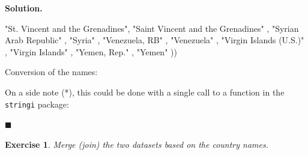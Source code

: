 \documentclass[10pt,b5paper,krantz1]{krantz}
\newenvironment{Shaded}{\begin{snugshade}}{\end{snugshade}}
\newcommand{\ControlFlowTok}[1]{\textcolor[rgb]{0.27,0.27,0.27}{\textbf{#1}}}
\newcommand{\DataTypeTok}[1]{\textcolor[rgb]{0.27,0.27,0.27}{#1}}
\newcommand{\DecValTok}[1]{\textcolor[rgb]{0.06,0.06,0.06}{#1}}
\newcommand{\KeywordTok}[1]{\textcolor[rgb]{0.27,0.27,0.27}{\textbf{#1}}}
\newcommand{\NormalTok}[1]{#1}
\newcommand{\OperatorTok}[1]{\textcolor[rgb]{0.43,0.43,0.43}{\textbf{#1}}}
\newcommand{\OtherTok}[1]{\textcolor[rgb]{0.37,0.37,0.37}{#1}}
\newcommand{\StringTok}[1]{\textcolor[rgb]{0.5,0.5,0.5}{#1}}
\newtheorem{exercise}{Exercise}[chapter]
\newenvironment{solution}{%
\bigskip\noindent\textbf{Solution. }%
\it\ignorespaces%
\ignorespaces%
}{\ignorespaces%
\hfill$\blacksquare$%
}
\begin{document}
\begin{solution}
\begin{Shaded}
\begin{Highlighting}[]
\StringTok{"St. Vincent and the Grenadines"}\NormalTok{, }\StringTok{"Saint Vincent and the Grenadines"}\NormalTok{  ,}
\StringTok{"Syrian Arab Republic"}\NormalTok{          , }\StringTok{"Syria"}\NormalTok{                             ,}
\StringTok{"Venezuela, RB"}\NormalTok{                 , }\StringTok{"Venezuela"}\NormalTok{                         ,}
\StringTok{"Virgin Islands (U.S.)"}\NormalTok{         , }\StringTok{"Virgin Islands"}\NormalTok{                    ,}
\StringTok{"Yemen, Rep."}\NormalTok{                   , }\StringTok{"Yemen"}
\NormalTok{))}
\end{Highlighting}
\end{Shaded}

Conversion of the names:

\begin{Shaded}
\end{Shaded}

On a side note (*), this could be done with a single call to
a function in the \texttt{stringi} package:

\begin{Shaded}
\end{Shaded}

\end{solution}

\begin{exercise}

Merge (join) the two datasets based on the country names.

\end{exercise}
\end{document}
